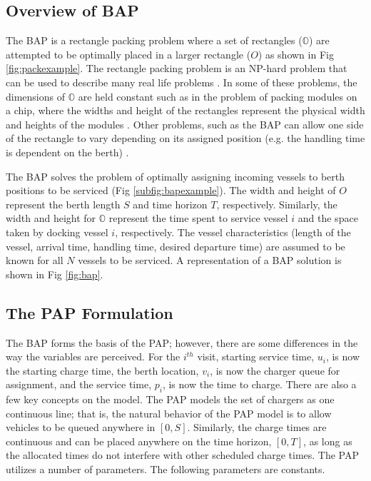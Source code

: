 \documentclass[utf8]{FrontiersinHarvard}
\let\cite\citep                                                                 %
\begin{document}
\subsection{Overview of BAP}
The BAP is a rectangle packing problem where a set
of rectangles ($\mathbb{O}$) are attempted to be optimally placed in a larger rectangle ($O$) as shown in Fig
\ref{fig:packexample}. The rectangle packing problem is an NP-hard problem that can be used to describe many real life
problems \cite{Bruin2013,Murata1995}. In some of these problems, the dimensions of $\mathbb{O}$ are held constant such
as in the problem of packing modules on a chip, where the widths and height of the rectangles represent the physical
width and heights of the modules \cite{Murata1995}. Other problems, such as the BAP can allow one side of
the rectangle to vary depending on its assigned position (e.g. the handling time is dependent on the berth)
\cite{Buhrkal2010}.

The BAP solves the problem of optimally assigning incoming vessels to berth positions to be serviced (Fig
\ref{subfig:bapexample}). The width and height of $O$ represent the berth length $S$ and time horizon $T$, respectively.
Similarly, the width and height for $\mathbb{O}$ represent the time spent to service vessel $i$ and the space taken by
docking vessel $i$, respectively. The vessel characteristics (length of the vessel, arrival time, handling time, desired
departure time) are assumed to be known for all $N$ vessels to be serviced. A representation of a BAP solution is shown
in Fig \ref{fig:bap}.

\subsection{The PAP Formulation}
The BAP forms the basis of the PAP; however, there are some differences in the way the variables are
perceived. For the $i^{th}$ visit, starting service time, $u_i$, is now the starting charge time, the berth location,
$v_i$, is now the charger queue for assignment, and the service time, $p_i$, is now the time to charge. There are also a few
key concepts on the model. The PAP models the set of chargers as one continuous line; that is, the natural behavior of the PAP model is
to allow vehicles to be queued anywhere in $[0,S]$. Similarly, the charge times are continuous and 
can be placed anywhere on the time horizon, $[0,T]$, as long as the allocated times do not interfere with other scheduled charge times.
The PAP utilizes a number of parameters. The following parameters are constants. 
\end{document}
